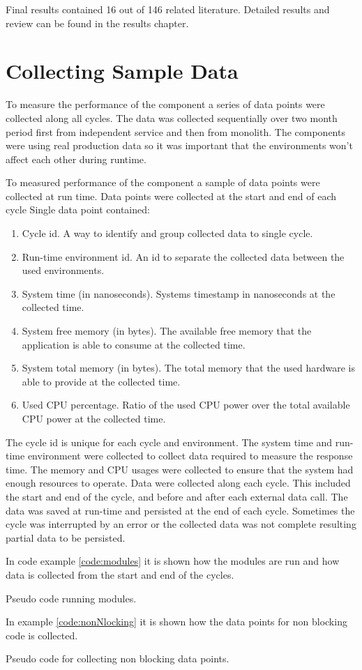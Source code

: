 Final results contained 16 out of 146 related literature.
Detailed results and review can be found in the results chapter.

\section{Collecting Sample Data}
To measure the performance of the component a series of data points were collected along all cycles.
The data was collected sequentially over two month period first from independent service and then from monolith.
The components were using real production data so it was important that the environments won't affect each other during runtime.

To measured performance of the component a sample of data points were collected at run time.
Data points were collected at the start and end of each cycle
Single data point contained:
\begin{enumerate}
    \item Cycle id. A way to identify and group collected data to single cycle.
    \item Run-time environment id. An id to separate the collected data between the used environments.
    \item System time (in nanoseconds). Systems timestamp in nanoseconds at the collected time.
    \item System free memory (in bytes). The available free memory that the application is able to consume at the collected time.
    \item System total memory (in bytes). The total memory that the used hardware is able to provide at the collected time.
    \item Used CPU percentage. Ratio of the used CPU power over the total available CPU power at the collected time.
\end{enumerate}

The cycle id is unique for each cycle and environment.
The system time and run-time environment were collected to collect data required to measure the response time.
The memory and CPU usages were collected to ensure that the system had enough resources to operate.
Data were collected along each cycle.
This included the start and end of the cycle, and before and after each external data call.
The data was saved at run-time and persisted at the end of each cycle.
Sometimes the cycle was interrupted by an error or the collected data was not complete resulting partial data to be persisted.

In code example \ref{code:modules} it is shown how the modules are run and how data is collected from the start and end of the cycles.
\begin{table}
    
    \caption{Pseudo code running modules.}
    \label{code:modules}
\end{table}
In example \ref{code:nonNlocking} it is shown how the data points for non blocking code is collected.
\begin{table}
    
    \caption{Pseudo code for collecting non blocking data points.}
    \label{code:nonNlocking}
\end{table}